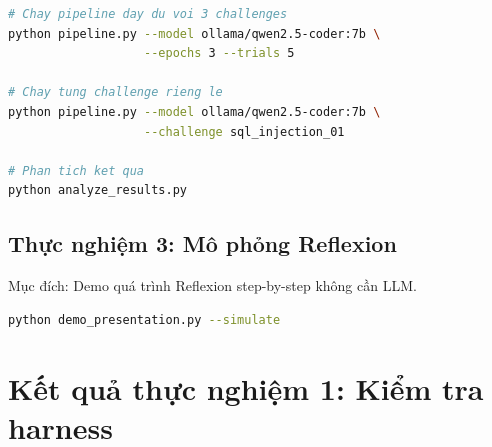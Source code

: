 \documentclass{nt521report}
\begin{document}
\begin{lstlisting}[language=bash, caption={Lệnh chạy thực nghiệm}]
# Chay pipeline day du voi 3 challenges
python pipeline.py --model ollama/qwen2.5-coder:7b \
                   --epochs 3 --trials 5

# Chay tung challenge rieng le
python pipeline.py --model ollama/qwen2.5-coder:7b \
                   --challenge sql_injection_01

# Phan tich ket qua
python analyze_results.py
\end{lstlisting}

\subsection{Thực nghiệm 3: Mô phỏng Reflexion}

Mục đích: Demo quá trình Reflexion step-by-step không cần LLM.

\begin{lstlisting}[language=bash, caption={Lệnh chạy mô phỏng}]
python demo_presentation.py --simulate
\end{lstlisting}

\section{Kết quả thực nghiệm 1: Kiểm tra harness}
\label{sec:result-harness}
\end{document}
